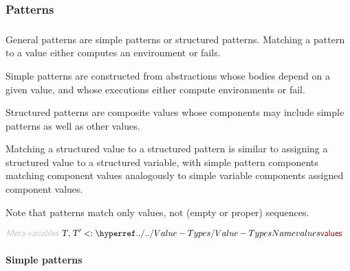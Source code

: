 \subsubsection*{Patterns}\hypertarget{patterns}{}\label{patterns}

\begin{align*}
  [ ~ 
  \KEY{Datatype} ~ & \NAMEREF{patterns} \\
  \KEY{Funcon} ~ & \NAMEREF{pattern} \\
  \KEY{Funcon} ~ & \NAMEREF{pattern-any} \\
  \KEY{Funcon} ~ & \NAMEREF{pattern-bind} \\
  \KEY{Funcon} ~ & \NAMEREF{pattern-type} \\
  \KEY{Funcon} ~ & \NAMEREF{pattern-else} \\
  \KEY{Funcon} ~ & \NAMEREF{pattern-unite} \\
  \KEY{Funcon} ~ & \NAMEREF{match} \\
  \KEY{Funcon} ~ & \NAMEREF{match-loosely} \\
  \KEY{Funcon} ~ & \NAMEREF{case-match} \\
  \KEY{Funcon} ~ & \NAMEREF{case-match-loosely} \\
  \KEY{Funcon} ~ & \NAMEREF{case-variant-value}
  ~ ]
\end{align*}
General patterns are simple patterns or structured patterns.
  Matching a pattern to a value either computes an environment or fails.

Simple patterns are constructed from abstractions whose bodies depend on 
  a given value, and whose executions either compute environments or fail.

Structured patterns are composite values whose components may include
  simple patterns as well as other values.

Matching a structured value to a structured pattern is similar to assigning 
  a structured value to a structured variable, with simple pattern components 
  matching component values analogously to simple variable components assigned
  component values.

Note that patterns match only values, not (empty or proper) sequences.

\begin{align*}
  \KEY{Meta-variables} ~ 
  & \VAR{T}, \VAR{T}' <: \NAMEHYPER{../..}{Value-Types}{values}
\end{align*}
\paragraph*{Simple patterns}\hypertarget{simple-patterns}{}\label{simple-patterns}

